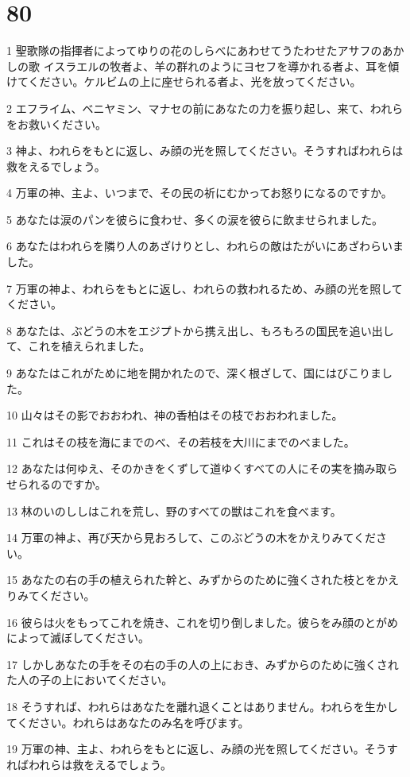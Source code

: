 \chapter{80}

\par 1 聖歌隊の指揮者によってゆりの花のしらべにあわせてうたわせたアサフのあかしの歌 イスラエルの牧者よ、羊の群れのようにヨセフを導かれる者よ、耳を傾けてください。ケルビムの上に座せられる者よ、光を放ってください。
\par 2 エフライム、ベニヤミン、マナセの前にあなたの力を振り起し、来て、われらをお救いください。
\par 3 神よ、われらをもとに返し、み顔の光を照してください。そうすればわれらは救をえるでしょう。
\par 4 万軍の神、主よ、いつまで、その民の祈にむかってお怒りになるのですか。
\par 5 あなたは涙のパンを彼らに食わせ、多くの涙を彼らに飲ませられました。
\par 6 あなたはわれらを隣り人のあざけりとし、われらの敵はたがいにあざわらいました。
\par 7 万軍の神よ、われらをもとに返し、われらの救われるため、み顔の光を照してください。
\par 8 あなたは、ぶどうの木をエジプトから携え出し、もろもろの国民を追い出して、これを植えられました。
\par 9 あなたはこれがために地を開かれたので、深く根ざして、国にはびこりました。
\par 10 山々はその影でおおわれ、神の香柏はその枝でおおわれました。
\par 11 これはその枝を海にまでのべ、その若枝を大川にまでのべました。
\par 12 あなたは何ゆえ、そのかきをくずして道ゆくすべての人にその実を摘み取らせられるのですか。
\par 13 林のいのししはこれを荒し、野のすべての獣はこれを食べます。
\par 14 万軍の神よ、再び天から見おろして、このぶどうの木をかえりみてください。
\par 15 あなたの右の手の植えられた幹と、みずからのために強くされた枝とをかえりみてください。
\par 16 彼らは火をもってこれを焼き、これを切り倒しました。彼らをみ顔のとがめによって滅ぼしてください。
\par 17 しかしあなたの手をその右の手の人の上におき、みずからのために強くされた人の子の上においてください。
\par 18 そうすれば、われらはあなたを離れ退くことはありません。われらを生かしてください。われらはあなたのみ名を呼びます。
\par 19 万軍の神、主よ、われらをもとに返し、み顔の光を照してください。そうすればわれらは救をえるでしょう。

